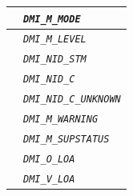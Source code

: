 \documentclass{template/openetcs}
\begin{document}
\begin{itemize}
\begin{longtable}{|l|l|}
				\hline
				
				&	\begin{minipage}[t]{0.78\linewidth} \emph{\texttt{DMI\_M\_MODE}} \end{minipage} \\
				
				\hline
				
				&	\begin{minipage}[t]{0.78\linewidth} \emph{\texttt{DMI\_M\_LEVEL}} \end{minipage} \\
				
				\hline
				
				&	\begin{minipage}[t]{0.78\linewidth} \emph{\texttt{DMI\_NID\_STM}} \end{minipage} \\
				
				\hline
				
				&	\begin{minipage}[t]{0.78\linewidth} \emph{\texttt{DMI\_NID\_C}} \end{minipage} \\
				
				\hline
				
				&	\begin{minipage}[t]{0.78\linewidth} \emph{\texttt{DMI\_NID\_C\_UNKNOWN}} \end{minipage} \\
				
				\hline
				
				&	\begin{minipage}[t]{0.78\linewidth} \emph{\texttt{DMI\_M\_WARNING}} \end{minipage} \\
				
				\hline
				
				&	\begin{minipage}[t]{0.78\linewidth} \emph{\texttt{DMI\_M\_SUPSTATUS}} \end{minipage} \\
				
				\hline
				
				&	\begin{minipage}[t]{0.78\linewidth} \emph{\texttt{DMI\_O\_LOA}} \end{minipage} \\
				
				\hline
				
				&	\begin{minipage}[t]{0.78\linewidth} \emph{\texttt{DMI\_V\_LOA}} \end{minipage} \\
				

\end{longtable}
\end{itemize}
\end{document}
